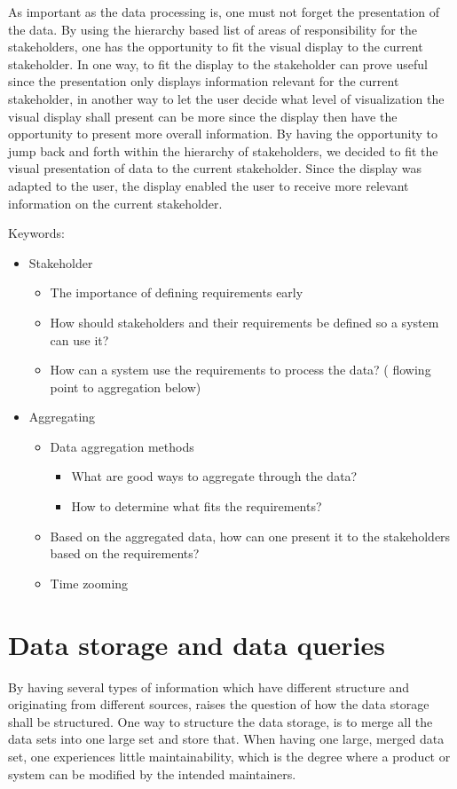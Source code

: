 As important as the data processing is, one must not forget the presentation of
the data. By using the hierarchy based list of areas of responsibility for the
stakeholders, one has the opportunity to fit the visual display to the current
stakeholder. In one way, to fit the display to the stakeholder can prove 
useful since the presentation only displays information relevant for the 
current stakeholder, in another way to let the user decide what level of 
visualization the visual display shall present can be more since the display 
then have the opportunity to present more overall information. By having the 
opportunity to jump
back and forth within the hierarchy of stakeholders, we decided to fit the 
visual presentation of data to the current stakeholder. Since the display was 
adapted to the user, the display enabled the user to receive more relevant 
information on the current stakeholder.

Keywords:
\begin{itemize}
	\item Stakeholder
	\begin{itemize}
		\item The importance of defining requirements early
		\item How should stakeholders and their requirements be defined so 
		a system can use it?
		\item How can a system use the requirements to process the data? (
		flowing point to aggregation below)
	\end{itemize}
	\item Aggregating
	\begin{itemize}
		\item Data aggregation methods
		\begin{itemize}
			\item What are good ways to aggregate through the data?
			\item How to determine what fits the requirements?
		\end{itemize}
		\item Based on the aggregated data, how can one present it to the
		stakeholders based on the requirements?
		\item Time zooming
	\end{itemize}
\end{itemize}



\section{Data storage and data queries} %
\label{sec:discussion_data_storage_and_data_queries}
By having several types of information which have different structure and
originating from different sources, raises the question of how the data storage
shall be structured. One way to structure the data storage, is to merge all the
data sets into one large set and store that. When having one large, merged 
data set, one experiences little maintainability, which is the degree where a
product or system can be modified by the intended maintainers\cite[p. 195]{Bass:2012:SAP:2392670}.

